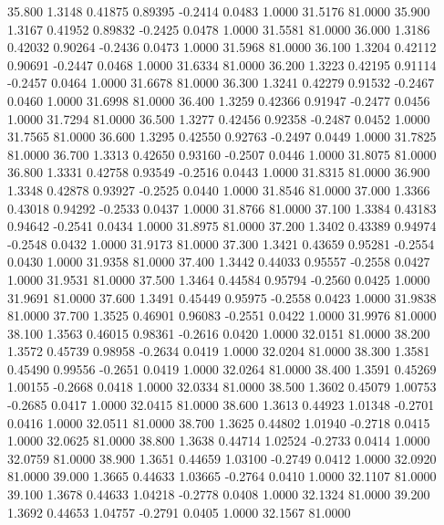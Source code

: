   35.800   1.3148   0.41875   0.89395  -0.2414   0.0483   1.0000  31.5176  81.0000
  35.900   1.3167   0.41952   0.89832  -0.2425   0.0478   1.0000  31.5581  81.0000
  36.000   1.3186   0.42032   0.90264  -0.2436   0.0473   1.0000  31.5968  81.0000
  36.100   1.3204   0.42112   0.90691  -0.2447   0.0468   1.0000  31.6334  81.0000
  36.200   1.3223   0.42195   0.91114  -0.2457   0.0464   1.0000  31.6678  81.0000
  36.300   1.3241   0.42279   0.91532  -0.2467   0.0460   1.0000  31.6998  81.0000
  36.400   1.3259   0.42366   0.91947  -0.2477   0.0456   1.0000  31.7294  81.0000
  36.500   1.3277   0.42456   0.92358  -0.2487   0.0452   1.0000  31.7565  81.0000
  36.600   1.3295   0.42550   0.92763  -0.2497   0.0449   1.0000  31.7825  81.0000
  36.700   1.3313   0.42650   0.93160  -0.2507   0.0446   1.0000  31.8075  81.0000
  36.800   1.3331   0.42758   0.93549  -0.2516   0.0443   1.0000  31.8315  81.0000
  36.900   1.3348   0.42878   0.93927  -0.2525   0.0440   1.0000  31.8546  81.0000
  37.000   1.3366   0.43018   0.94292  -0.2533   0.0437   1.0000  31.8766  81.0000
  37.100   1.3384   0.43183   0.94642  -0.2541   0.0434   1.0000  31.8975  81.0000
  37.200   1.3402   0.43389   0.94974  -0.2548   0.0432   1.0000  31.9173  81.0000
  37.300   1.3421   0.43659   0.95281  -0.2554   0.0430   1.0000  31.9358  81.0000
  37.400   1.3442   0.44033   0.95557  -0.2558   0.0427   1.0000  31.9531  81.0000
  37.500   1.3464   0.44584   0.95794  -0.2560   0.0425   1.0000  31.9691  81.0000
  37.600   1.3491   0.45449   0.95975  -0.2558   0.0423   1.0000  31.9838  81.0000
  37.700   1.3525   0.46901   0.96083  -0.2551   0.0422   1.0000  31.9976  81.0000
  38.100   1.3563   0.46015   0.98361  -0.2616   0.0420   1.0000  32.0151  81.0000
  38.200   1.3572   0.45739   0.98958  -0.2634   0.0419   1.0000  32.0204  81.0000
  38.300   1.3581   0.45490   0.99556  -0.2651   0.0419   1.0000  32.0264  81.0000
  38.400   1.3591   0.45269   1.00155  -0.2668   0.0418   1.0000  32.0334  81.0000
  38.500   1.3602   0.45079   1.00753  -0.2685   0.0417   1.0000  32.0415  81.0000
  38.600   1.3613   0.44923   1.01348  -0.2701   0.0416   1.0000  32.0511  81.0000
  38.700   1.3625   0.44802   1.01940  -0.2718   0.0415   1.0000  32.0625  81.0000
  38.800   1.3638   0.44714   1.02524  -0.2733   0.0414   1.0000  32.0759  81.0000
  38.900   1.3651   0.44659   1.03100  -0.2749   0.0412   1.0000  32.0920  81.0000
  39.000   1.3665   0.44633   1.03665  -0.2764   0.0410   1.0000  32.1107  81.0000
  39.100   1.3678   0.44633   1.04218  -0.2778   0.0408   1.0000  32.1324  81.0000
  39.200   1.3692   0.44653   1.04757  -0.2791   0.0405   1.0000  32.1567  81.0000

